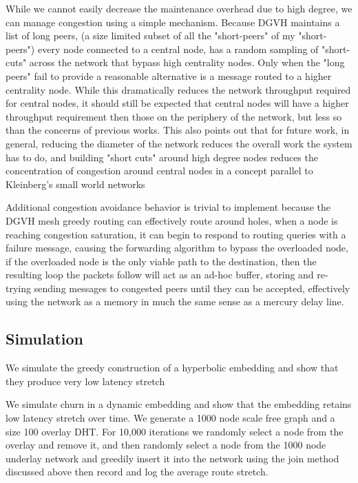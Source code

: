 While we cannot easily decrease the maintenance overhead due to high degree, we can manage congestion using a simple mechanism.
Because DGVH maintains a list of long peers, (a size limited subset of all the "short-peers" of my "short-peers") every node connected to a central node, has a random sampling of "short-cuts" across the network that bypass high centrality nodes.
Only when the "long peers" fail to provide a reasonable alternative is a message routed to a higher centrality node.
While this dramatically reduces the network throughput required for central nodes, it should still be expected that central nodes will have a higher throughput requirement then those on the periphery of the network, but less so than the concerns of previous works\cite{kleinberg2007geographic}.
This also points out that for future work, in general, reducing the diameter of the network reduces the overall work the system has to do, and building "short cuts" around high degree nodes reduces the concentration of congestion around central nodes in a concept parallel to Kleinberg's small world networks\cite{kleinberg2000navigation}

Additional congestion avoidance behavior is trivial to implement because the DGVH mesh greedy routing can effectively route around holes, when a node is reaching congestion saturation, it can begin to respond to routing queries with a failure message, causing the forwarding algorithm to bypass the overloaded node, if the overloaded node is the only viable path to the destination, then the resulting loop the packets follow will act as an ad-hoc buffer, storing and re-trying sending messages to congested peers until they can be accepted, effectively using the network as a memory in much the same sense as a mercury delay line\cite{auerbach1949mercury}.


\subsection{Simulation}

We simulate the greedy construction of a hyperbolic embedding and show that they produce very low latency stretch

We simulate churn in a dynamic embedding and show that the embedding retains low latency stretch over time. We generate a 1000 node scale free graph and a size 100 overlay DHT. For 10,000 iterations we randomly select a node from the overlay and remove it, and then randomly select a node from the 1000 node underlay network and greedily insert it into the network using the join method discussed above then record and log the average route stretch.

